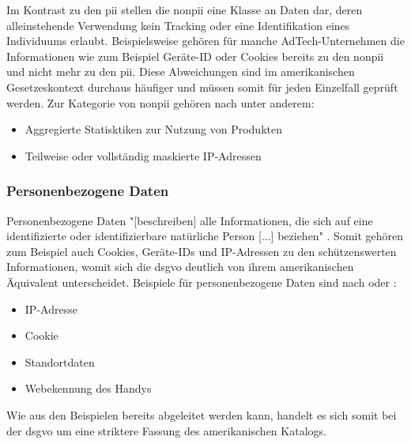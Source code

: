 Im Kontrast zu den \ac{pii} stellen die \ac{nonpii} eine Klasse an Daten dar, deren alleinstehende Verwendung kein Tracking oder eine Identifikation eines Individuums erlaubt. Beispielsweise gehören für manche AdTech-Unternehmen die Informationen wie zum Beispiel Geräte-ID oder Cookies bereits zu den \ac{nonpii} und nicht mehr zu den \ac{pii}. Diese Abweichungen sind im amerikanischen Gesetzeskontext durchaus häufiger und müssen somit für jeden Einzelfall geprüft werden. Zur Kategorie von \ac{nonpii} gehören nach \cite{PiwikPro2022} unter anderem:

\begin{itemize}
	\item Aggregierte Statisktiken zur Nutzung von Produkten
	\item Teilweise oder vollständig maskierte IP-Adressen
\end{itemize}

\subsubsection{Personenbezogene Daten}
\label{sec:Grundlagen:ssec:Klassifikation von Daten:sssec:Personenbezogene Daten}

Personenbezogene Daten "[beschreiben] alle Informationen, die sich auf eine identifizierte oder identifizierbare natürliche Person [...] beziehen" \cite{DSGVOArt4}. Somit gehören zum Beispiel auch Cookies, Geräte-IDs und IP-Adressen zu den schützenswerten Informationen, womit sich die \ac{dsgvo} deutlich von ihrem amerikanischen Äquivalent unterscheidet. Beispiele für personenbezogene Daten sind nach \cite{PiwikPro2022} oder \cite{DSGVOPerDa}:

\begin{itemize}
	\item IP-Adresse
	\item Cookie
	\item Standortdaten
	\item Webekennung des Handys
\end{itemize}

Wie aus den Beispielen bereits abgeleitet werden kann, handelt es sich somit bei der \ac{dsgvo} um eine striktere Fassung des amerikanischen Katalogs.

